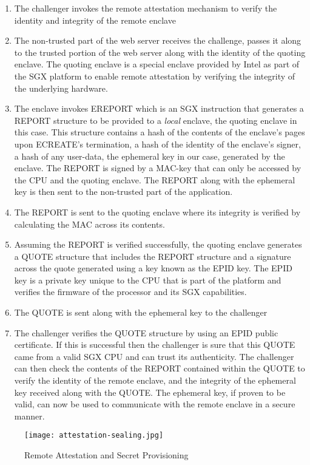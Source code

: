 \documentclass[../main.tex]{subfiles}
\begin{document}
		\begin{enumerate}
			\item The challenger invokes the remote attestation mechanism to verify the identity and integrity of the remote enclave
			\item The non-trusted part of the web server receives the challenge, passes it along to the trusted portion of the web server
			along with the identity of the quoting enclave. The quoting enclave is a special enclave provided by Intel as part of the SGX
			platform to enable remote attestation by verifying the integrity of the underlying hardware. %
			\item The enclave invokes EREPORT which is an SGX instruction that generates a REPORT structure to be provided to a \textit{local} enclave, the quoting enclave in this case.
			This structure contains a hash of the contents of the enclave's pages upon ECREATE's termination, a hash of the identity of the enclave's signer, a hash of any user-data, the ephemeral key in our case,
			generated by the enclave. The REPORT is signed by a MAC-key that can only be accessed by the CPU and the quoting enclave. The REPORT along with the ephemeral key is then sent to the non-trusted part of the application.
			\item The REPORT is sent to the quoting enclave where its integrity is verified by calculating the MAC across its contents. 
			\item Assuming the REPORT is verified successfully, the quoting enclave generates a QUOTE structure that includes the REPORT structure and a signature across
			the quote generated using a key known as the EPID key. %
			The EPID key is a private key unique to the CPU that is part of the platform and verifies the firmware of the processor and its SGX capabilities. 
			\item The QUOTE is sent along with the ephemeral key to the challenger
			\item The challenger verifies the QUOTE structure by using an EPID public certificate. If this is successful then the challenger is sure that this QUOTE came from a valid SGX CPU and can trust
			its authenticity. The challenger can then check the contents of the REPORT contained within the QUOTE to verify the identity of the remote enclave, and the integrity of the ephemeral key 
			received along with the QUOTE. The ephemeral key, if proven to be valid, can now be used to communicate with the remote enclave in a secure manner.  
		\end{enumerate}
		
		\begin{figure}[H]
			\centering
			\texttt{[image: attestation-sealing.jpg]}
			\caption{Remote Attestation and Secret Provisioning}
			\label{fig:attest}
		\end{figure}
\end{document}
